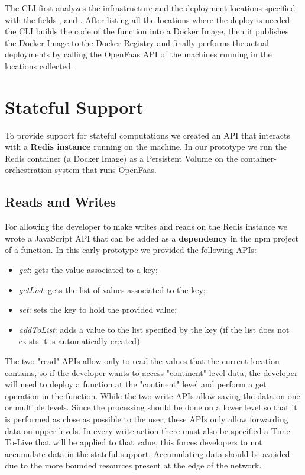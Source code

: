 The CLI first analyzes the infrastructure and the deployment locations specified with the fields ,  and . After listing all the locations where the deploy is needed the CLI builds the code of the function into a Docker Image, then it publishes the Docker Image to the Docker Registry and finally performs the actual deployments by calling the OpenFaas API of the machines running in the locations collected.


\section{Stateful Support}
To provide support for stateful computations we created an API that interacts with a \textbf{Redis instance} running on the machine.
In our prototype we run the Redis container (a Docker Image) as a Persistent Volume on the container-orchestration system that runs OpenFaas.


\subsection{Reads and Writes}

For allowing the developer to make writes and reads on the Redis instance we wrote a JavaScript API that can be added as a \textbf{dependency} in the npm project of a function.
In this early prototype we provided the following APIs:

\begin{itemize}
    \item \textit{get}: gets the value associated to a key;
    \item \textit{getList}: gets the list of values associated to the key;
    \item \textit{set}: sets the key to hold the provided value;
    \item \textit{addToList}: adds a value to the list specified by the key (if the list does not exists it is automatically created).
\end{itemize}
The two "read" APIs allow only to read the values that the current location contains, so if the developer wants to access "continent" level data, the developer will need to deploy a function at the "continent" level and perform a get operation in the function. 
While the two write APIs allow saving the data on one or multiple levels. Since the processing should be done on a lower level so that it is performed as close as possible to the user, these APIs only allow forwarding data on upper levels. In every write action there must also be specified a Time-To-Live that will be applied to that value, this forces developers to not accumulate data in the stateful support. Accumulating data should be avoided due to the more bounded resources present at the edge of the network.


